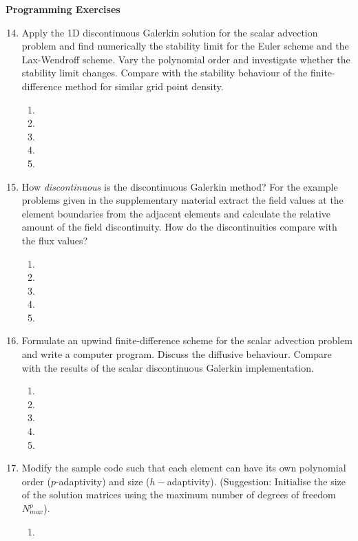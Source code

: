 {\bf Programming Exercises}
\begin{enumerate}
\setcounter{enumi}{13}
\item
Apply the 1D discontinuous Galerkin solution for the scalar advection problem and find numerically the stability limit for the Euler scheme and the Lax-Wendroff scheme. Vary the polynomial order and investigate whether the stability limit changes. Compare with the stability behaviour of the finite-difference method for similar grid point density. 
\begin{enumerate}
\item[]
\item[]
\item[] 
\item[]
\item[] 
\end{enumerate}
\item
How {\it discontinuous} is the discontinuous Galerkin method? For the example problems given in the supplementary material extract the field values at the element boundaries from the adjacent elements and calculate the relative amount of the field discontinuity. How do the discontinuities compare with the flux values? 
\begin{enumerate}
\item[]
\item[]
\item[] 
\item[]
\item[] 
\end{enumerate}
\item
Formulate an upwind finite-difference scheme for the scalar advection problem and write a computer program. Discuss the diffusive behaviour. Compare with the results of the scalar discontinuous Galerkin implementation. 
\begin{enumerate}
\item[]
\item[]
\item[] 
\item[]
\item[] 
\end{enumerate}
\item
Modify the sample code such that each element can have its own polynomial order ($p$-adaptivity) and size ($h-$adaptivity). (Suggestion: Initialise the size of the solution  matrices using the maximum number of degrees of freedom $N^p_{max}$).     
\begin{enumerate}
\item[]

\end{enumerate}
\end{enumerate}
